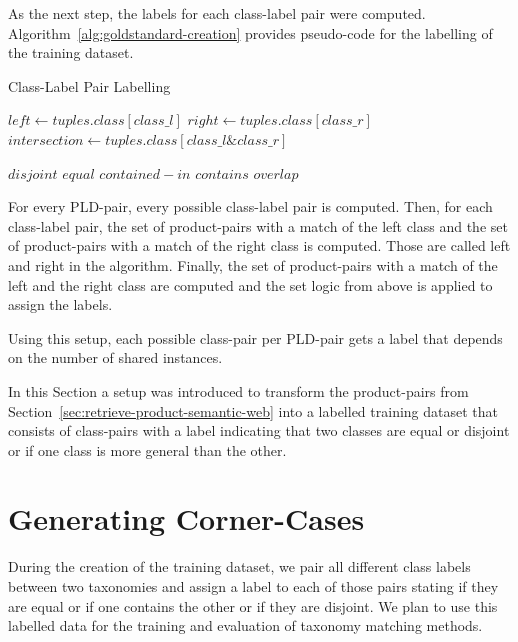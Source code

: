 As the next step, the labels for each class-label pair were computed.
Algorithm~\ref{alg:goldstandard-creation} provides pseudo-code for the labelling of the training dataset.
\begin{algorithm}{}
\caption{Class-Label Pair Labelling}
\label{alg:goldstandard-creation}
\begin{algorithmic}[1]
\LOOP
				\STATE $left \leftarrow tuples.class[class\_l]$
				\STATE $right \leftarrow tuples.class[class\_r]$
				\STATE $intersection \leftarrow tuples.class[class\_l \& class\_r]$

					\RETURN $disjoint$
				\ENDIF
					\RETURN $equal$
				\ENDIF
					\RETURN $contained-in$
				\ENDIF
					\RETURN $contains$
				\ENDIF
				\RETURN $overlap$
			\ENDFOR
		\ENDFOR
	\ENDFOR
\ENDLOOP
\end{algorithmic}
\end{algorithm}

For every PLD-pair, every possible class-label pair is computed.
Then, for each class-label pair, the set of product-pairs with a match of the left
class and the set of product-pairs with a match of the right class is computed.
Those are called left and right in the algorithm.
Finally, the set of product-pairs with a match of the left and the right class
are computed and the set logic from above is applied to assign the labels.

Using this setup, each possible class-pair per PLD-pair gets a label that depends on
the number of shared instances.

In this Section a setup was introduced to transform the product-pairs from Section~\ref{sec:retrieve-product-semantic-web}
into a labelled training dataset that consists of class-pairs with a label indicating that two
classes are equal or disjoint or if one class is more general than the other.

\section{Generating Corner-Cases}
\label{sec:corner-cases}

During the creation of the training dataset, we pair all different class labels between two taxonomies and assign a label
to each of those pairs stating if they are equal or if one contains the other or if they are disjoint.
We plan to use this labelled data for the training and evaluation of taxonomy matching methods.

